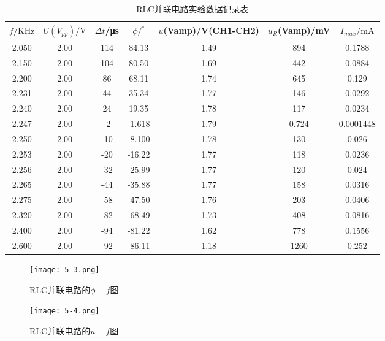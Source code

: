 \documentclass[12pt]{article}
\begin{document}
\begin{table}[htbp]
    \centering
    \begin{tabular}{|c|c|c|c|c|c|c|}
    \hline
    $f/\mathrm{KHz}$ & $U(V_{pp})/\mathrm{V}$ & $\Delta t$/μs & $\phi/^{\circ}$ & $u$(Vamp)/V(CH1-CH2) & $u_R$(Vamp)/mV & $I_{max}/\mathrm{mA}$ \\
    \hline
    2.050  & 2.00  & 114  & 84.13  & 1.49 & 894  & 0.1788 \\
    \hline
    2.150  & 2.00  & 104  & 80.50  & 1.69 & 442  & 0.0884 \\
    \hline
    2.200  & 2.00  & 86   & 68.11  & 1.74 & 645  & 0.129 \\
    \hline
    2.231  & 2.00  & 44   & 35.34  & 1.77 & 146  & 0.0292 \\
    \hline
    2.240  & 2.00  & 24   & 19.35  & 1.78 & 117  & 0.0234 \\
    \hline
    2.247  & 2.00  & -2   & -1.618  & 1.79 & 0.724 & 0.0001448 \\
    \hline
    2.250  & 2.00  & -10  & -8.100  & 1.78 & 130  & 0.026 \\
    \hline
    2.253  & 2.00  & -20  & -16.22  & 1.77 & 118  & 0.0236 \\
    \hline
    2.256  & 2.00  & -32  & -25.99  & 1.77 & 120  & 0.024 \\
    \hline
    2.265  & 2.00  & -44  & -35.88  & 1.77 & 158  & 0.0316 \\
    \hline
    2.275  & 2.00  & -58  & -47.50  & 1.76 & 203  & 0.0406 \\
    \hline
    2.320  & 2.00  & -82  & -68.49  & 1.73 & 408  & 0.0816 \\
    \hline
    2.400  & 2.00  & -94  & -81.22  & 1.62 & 778  & 0.1556 \\
    \hline
    2.600  & 2.00  & -92  & -86.11  & 1.18 & 1260 & 0.252 \\
    \hline
    \end{tabular}%
    \caption{RLC并联电路实验数据记录表}
\end{table}%

\begin{figure}[htbp]
    \begin{minipage}[t]{0.5\linewidth}
        \centering
        \texttt{[image: 5-3.png]}
        \caption{RLC并联电路的$\phi-f$图}
    \end{minipage}
    \begin{minipage}[t]{0.5\linewidth}
        \centering
        \texttt{[image: 5-4.png]}
        \caption{RLC并联电路的$u-f$图}
    \end{minipage}
\end{figure}
\end{document}
